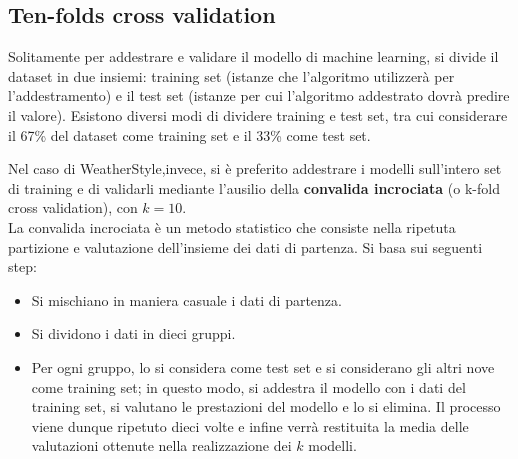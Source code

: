 \documentclass[a4paper, 11pt, oneside]{report}
\begin{document}
                \subsection{Ten-folds cross validation}
                Solitamente per addestrare e validare il modello di machine learning, si divide il dataset in due insiemi: training
                set (istanze che l'algoritmo utilizzerà per l'addestramento) e il test set (istanze per cui l'algoritmo
                addestrato dovrà predire il valore). Esistono diversi modi di dividere training e test set, tra cui
                considerare il 67\% del dataset come training set e il 33\% come test set.
                \\
                \par \noindent Nel caso di WeatherStyle,invece, si è preferito addestrare i modelli sull'intero set di
                training e di validarli mediante l'ausilio della \textbf{convalida incrociata} (o k-fold cross validation), con $k=10$.
                \\ \noindent La convalida incrociata è un metodo statistico che consiste nella ripetuta partizione e
                valutazione dell'insieme dei dati di partenza. Si basa sui seguenti step:
                \begin{itemize}
                    \item Si mischiano in maniera casuale i dati di partenza.
                    \item Si dividono i dati in dieci gruppi.
                    \item Per ogni gruppo, lo si considera come test set e si considerano gli altri nove come training set;
                    in questo modo, si addestra il modello con i dati del training set, si valutano le prestazioni del modello
                    e lo si elimina. Il processo viene dunque ripetuto dieci volte e infine verrà restituita la media delle
                    valutazioni ottenute nella realizzazione dei $k$ modelli.
                \end{itemize}
\end{document}
